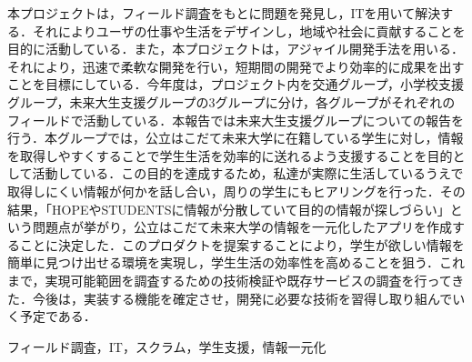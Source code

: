 \documentclass[openany,11pt,papersize,dvipdfm]{jsbook}
\begin{document}
%
\maketitle

\frontmatter

\begin{jabstract}
本プロジェクトは，フィールド調査をもとに問題を発見し，ITを用いて解決する．それによりユーザの仕事や生活をデザインし，地域や社会に貢献することを目的に活動している．また，本プロジェクトは，アジャイル開発手法を用いる．それにより，迅速で柔軟な開発を行い，短期間の開発でより効率的に成果を出すことを目標にしている．今年度は，プロジェクト内を交通グループ，小学校支援グループ，未来大生支援グループの3グループに分け，各グループがそれぞれのフィールドで活動している．本報告では未来大生支援グループについての報告を行う．本グループでは，公立はこだて未来大学に在籍している学生に対し，情報を取得しやすくすることで学生生活を効率的に送れるよう支援することを目的として活動している．この目的を達成するため，私達が実際に生活しているうえで取得しにくい情報が何かを話し合い，周りの学生にもヒアリングを行った．その結果，「HOPEやSTUDENTSに情報が分散していて目的の情報が探しづらい」という問題点が挙がり，公立はこだて未来大学の情報を一元化したアプリを作成することに決定した．このプロダクトを提案することにより，学生が欲しい情報を簡単に見つけ出せる環境を実現し，学生生活の効率性を高めることを狙う．これまで，実現可能範囲を調査するための技術検証や既存サービスの調査を行ってきた．今後は，実装する機能を確定させ，開発に必要な技術を習得し取り組んでいく予定である．

\begin{jkeyword}
フィールド調査，IT，スクラム，学生支援，情報一元化
\end{jkeyword}
\end{jabstract}
\end{document}
